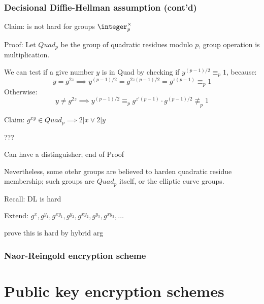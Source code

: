 
\subsubsection{Decisional Diffie-Hellman assumption (cont'd)}

Claim: \ddh is not hard for groups $\integer_p^\times$

Proof: Let $Quad_p$ be the group of quadratic residues modulo $p$, group operation is multiplication.

We can test if a give number $y$ is in Quad by checking if $y^{(p-1)/2} \equiv_p 1$, because:
\[
    y = g^{2z} \implies y^{(p-1)/2} = g^{2z(p-1)/2} = g^{z(p-1)} \equiv_p 1
\]
Otherwise: %
\[
    y \neq g^{2z} \implies y^{(p-1)/2} \equiv_p g^{z'(p-1)} \cdot g^{(p-1)/2} \not\equiv_p 1
\]

Claim: $g^{xy} \in Quad_p \implies 2 | x \vee 2 | y$

???

Can have a distinguisher; end of Proof

Nevertheless, some otehr groups are believed to harden quadratic residue membership; such groups are $Quad_p$ itself, or the elliptic curve groups.


Recall: DL is hard

Extend: $g^x, g^{y_1}, g^{xy_1}, g^{y_2}, g^{xy_2}, g^{y_3}, g^{xy_3}, \dots$

prove this is hard by hybrid arg

\subsubsection{Naor-Reingold encryption scheme}



\section{Public key encryption schemes}


